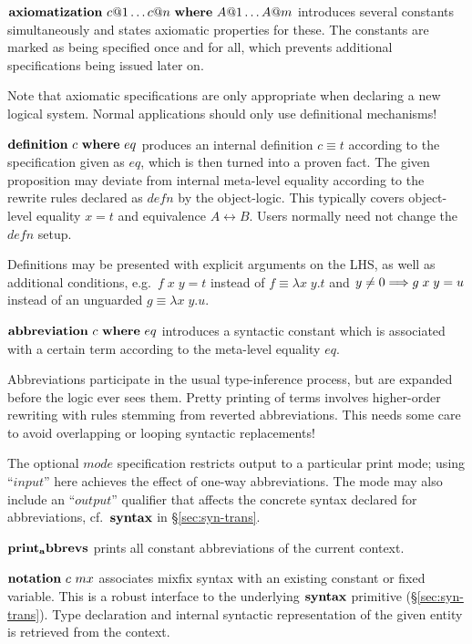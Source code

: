 \begin{descr}
  
\item ${\mathord{\mathbf{axiomatization}}} ~ c@1 \dots c@n ~
  {\mathord{\mathbf{where}}} ~ A@1 \dots A@m$ introduces several constants
  simultaneously and states axiomatic properties for these.  The
  constants are marked as being specified once and for all, which
  prevents additional specifications being issued later on.
  
  Note that axiomatic specifications are only appropriate when
  declaring a new logical system.  Normal applications should only use
  definitional mechanisms!

\item ${\mathord{\mathbf{definition}}}~c~{\mathord{\mathbf{where}}}~eq$ produces an
  internal definition $c \equiv t$ according to the specification
  given as $eq$, which is then turned into a proven fact.  The given
  proposition may deviate from internal meta-level equality according
  to the rewrite rules declared as $defn$ by the object-logic.  This
  typically covers object-level equality $x = t$ and equivalence $A
  \leftrightarrow B$.  Users normally need not change the $defn$
  setup.
  
  Definitions may be presented with explicit arguments on the LHS, as
  well as additional conditions, e.g.\ $f\;x\;y = t$ instead of $f
  \equiv \lambda x\;y. t$ and $y \not= 0 \Longrightarrow g\;x\;y = u$ instead of
  an unguarded $g \equiv \lambda x\;y. u$.
  
\item ${\mathord{\mathbf{abbreviation}}}~c~{\mathord{\mathbf{where}}}~eq$ introduces
  a syntactic constant which is associated with a certain term
  according to the meta-level equality $eq$.
  
  Abbreviations participate in the usual type-inference process, but
  are expanded before the logic ever sees them.  Pretty printing of
  terms involves higher-order rewriting with rules stemming from
  reverted abbreviations.  This needs some care to avoid overlapping
  or looping syntactic replacements!
  
  The optional $mode$ specification restricts output to a particular
  print mode; using ``$input$'' here achieves the effect of one-way
  abbreviations.  The mode may also include an ``$output$'' qualifier
  that affects the concrete syntax declared for abbreviations, cf.\ 
  ${\mathord{\mathbf{syntax}}}$ in \S\ref{sec:syn-trans}.
  
\item ${\mathord{\mathbf{print_abbrevs}}}$ prints all constant abbreviations
  of the current context.
  
\item ${\mathord{\mathbf{notation}}}~c~mx$ associates mixfix syntax with an
  existing constant or fixed variable.  This is a robust interface to
  the underlying ${\mathord{\mathbf{syntax}}}$ primitive
  (\S\ref{sec:syn-trans}).  Type declaration and internal syntactic
  representation of the given entity is retrieved from the context.
  
\end{descr}


